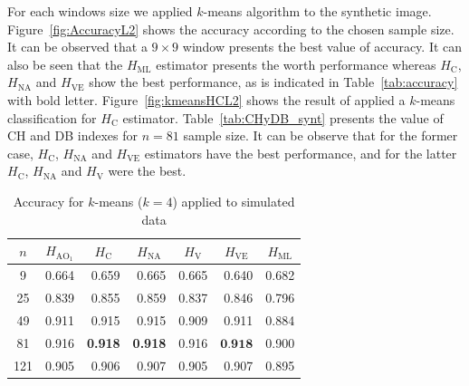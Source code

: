 \documentclass[journal]{IEEEtran}
\begin{document}
For each windows size we applied $k$-means algorithm to the synthetic image. Figure~\ref{fig:AccuracyL2} shows the accuracy according to the chosen sample size. It can be observed that a $9 \times 9$ window presents the best value of accuracy. It can also be seen that the $H_{\text{ML}}$ estimator presents the worth performance whereas $H_\text{C}$, $H_{\text{NA}}$ and $H_{\text{VE}}$ show the best performance, as is indicated in Table~\ref{tab:accuracy} with bold letter. Figure~\ref{fig:kmeansHCL2} shows the result of applied a $k$-means classification for $H_\text{C}$ estimator. Table~\ref{tab:CHyDB_synt} presents the value of CH and DB indexes for $n=81$ sample size. It can be observe that for the former case, $H_\text{C}$, $H_{\text{NA}}$ and $H_{\text{VE}}$ estimators have the best performance, and for the latter $H_\text{C}$, $H_{\text{NA}}$ and $H_{\text{V}}$ were the best.

\begin{table}[htbp]
  \centering
  \caption{Accuracy for $k$-means ($k=4$) applied to simulated data}
  \label{tab:accuracy}
    \begin{tabular}{crrrrrr}
    \midrule
    $n$     & \multicolumn{1}{c}{$H_{{\text{AO}}_1}$} & \multicolumn{1}{c}{$H_\text{C}$} & \multicolumn{1}{c}{$H_{\text{NA}}$} & \multicolumn{1}{c}{$H_\text{V}$} & \multicolumn{1}{c}{$H_{\text{VE}}$} & \multicolumn{1}{c}{$H_{\text{ML}}$}\\
    \midrule
    9 & 0.664 & 0.659 & 0.665 & 0.665 & 0.640 & 0.682 \\
    25  & 0.839 & 0.855 & 0.859 & 0.837 & 0.846 & 0.796 \\
    49  & 0.911 & 0.915 & 0.915 & 0.909 & 0.911 & 0.884 \\
    81  & 0.916 & \textbf{0.918} & \textbf{0.918} & 0.916 & $\textbf{0.918}$ & 0.900 \\
    121 & 0.905 & 0.906 & 0.907 & 0.905 & 0.907 & 0.895 \\
    \bottomrule
    \end{tabular}%
  \label{tab:addlabel}%
\end{table}
\end{document}
